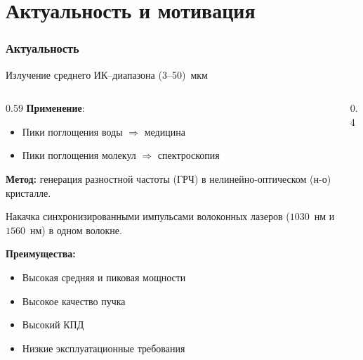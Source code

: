 \begin{frame}
    \setcounter{framenumber}{1}
    \maketitle
\end{frame}

\section{Актуальность и мотивация}

\begin{frame}[fragile]
	\justifying
	\frametitle{Актуальность}
	\begin{center}
		Излучение среднего ИК--диапазона (3--50)~мкм
	\end{center}
	
	\begin{columns}[t]
		\begin{column}{0.59\textwidth}
			\textbf{Применение}:
			\begin{itemize}
				\item Пики поглощения воды $\Rightarrow$ медицина
				\item Пики поглощения молекул $\Rightarrow$ спектроскопия				
			\end{itemize}			
			
			\textbf{Метод:} генерация разностной частоты (ГРЧ) в нелинейно-оптическом (н-о) кристалле.
			
			Накачка синхронизированными импульсами волоконных лазеров ($1030$~нм и $1560$~нм) в одном волокне.
			
			\textbf{Преимущества:}
			
			\begin{itemize}
					\item Высокая средняя и пиковая мощности
					\item Высокое качество пучка
					\item Высокий КПД
					\item Низкие эксплуатационные требования
			\end{itemize}			
		\end{column}
		\begin{column}{0.4\textwidth}
			

\end{column}
\end{columns}
\end{frame}
